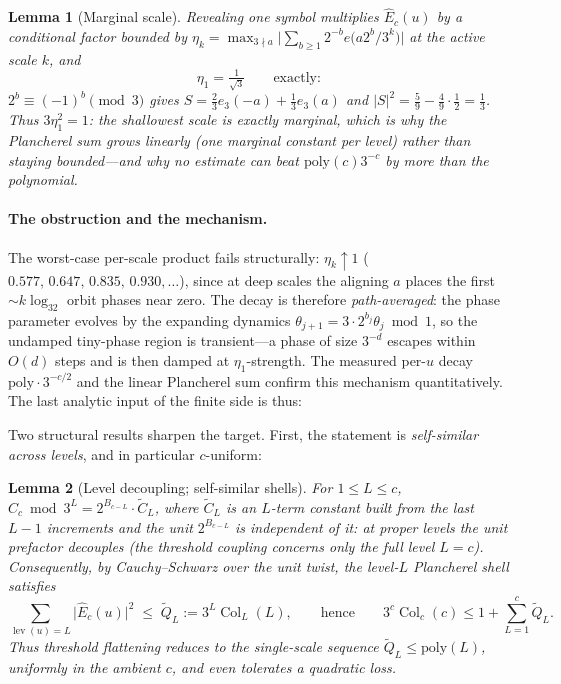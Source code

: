 \documentclass[11pt]{article}
\theoremstyle{plain}
\newtheorem{lemma}{Lemma}
\theoremstyle{definition}
\theoremstyle{remark}
\begin{document}
\begin{lemma}[Marginal scale]\label{lem:marginalscale}
Revealing one symbol multiplies $\hat E_c(u)$ by a conditional factor
bounded by $\eta_k=\max_{3\nmid a}\bigl|\sum_{b\ge1}2^{-b}
e\bigl(a2^b/3^k\bigr)\bigr|$ at the active scale $k$, and
\[
\eta_1=\tfrac1{\sqrt3}\qquad\text{exactly}:
\]
$2^b\equiv(-1)^b\pmod3$ gives $S=\tfrac23e_3(-a)+\tfrac13e_3(a)$ and
$|S|^2=\tfrac59-\tfrac49\cdot\tfrac12=\tfrac13$. Thus $3\eta_1^2=1$: the
shallowest scale is \emph{exactly marginal}, which is why the Plancherel
sum grows linearly (one marginal constant per level) rather than staying
bounded---and why no estimate can beat $\mathrm{poly}(c)3^{-c}$ by more
than the polynomial.
\end{lemma}

\paragraph{The obstruction and the mechanism.} The worst-case per-scale
product fails structurally: $\eta_k\uparrow1$
($0.577,\,0.647,\,0.835,\,0.930,\dots$), since at deep scales the aligning
$a$ places the first $\sim k\log_32$ orbit phases near zero. The decay is
therefore \emph{path-averaged}: the phase parameter evolves by the
expanding dynamics $\theta_{j+1}=3\cdot2^{b_j}\theta_j\bmod1$, so the
undamped tiny-phase region is transient---a phase of size $3^{-d}$ escapes
within $O(d)$ steps and is then damped at $\eta_1$-strength. The measured
per-$u$ decay $\mathrm{poly}\cdot3^{-c/2}$ and the linear Plancherel sum
confirm this mechanism quantitatively. The last analytic input of the
finite side is thus:

Two structural results sharpen the target. First, the statement is
\emph{self-similar across levels}, and in particular $c$-uniform:

\begin{lemma}[Level decoupling; self-similar shells]\label{lem:shells}
For $1\le L\le c$,
$C_c\bmod3^L=2^{B_{c-L}}\cdot\tilde C_L$, where $\tilde C_L$ is an
$L$-term constant built from the \emph{last} $L-1$ increments and the unit
$2^{B_{c-L}}$ is independent of it: at proper levels the unit prefactor
decouples (the threshold coupling concerns only the full level $L=c$).
Consequently, by Cauchy--Schwarz over the unit twist, the level-$L$
Plancherel shell satisfies
\[
\sum_{\operatorname{lev}(u)=L}\bigl|\hat E_c(u)\bigr|^2
\;\le\;\tilde Q_L:=3^L\operatorname{Col}_L(L),
\qquad\text{hence}\qquad
3^c\operatorname{Col}_c(c)\le1+\sum_{L=1}^{c}\tilde Q_L .
\]
Thus threshold flattening reduces to the \emph{single-scale} sequence
$\tilde Q_L\le\mathrm{poly}(L)$, uniformly in the ambient $c$, and even
tolerates a quadratic loss.
\end{lemma}
\end{document}
